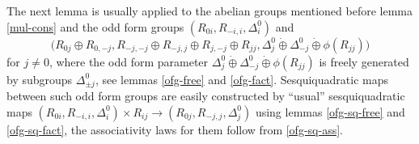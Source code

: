\documentclass{article}
\theoremstyle{definition}
\newcommand{\dotoplus}{\mathbin{\dot{\oplus}}}
\begin{document}
The next lemma is usually applied to the abelian groups mentioned before lemma \ref{mul-cons} and the odd form groups \(
    (R_{0i}, R_{-i, i}, \Delta^0_i)
\) and \[
    \bigl(
        R_{0j} \oplus R_{0, -j},
        R_{-j, -j} \oplus R_{-j, j}
            \oplus R_{j, -j} \oplus R_{jj},
        \Delta^0_j \dotoplus \Delta^0_{-j}
            \dotoplus \phi(R_{jj})
    \bigr)
\] for \(j \neq 0\), where the odd form parameter \(
    \Delta^0_j
    \dotoplus \Delta^0_{-j}
    \dotoplus \phi(R_{jj})
\) is freely generated by subgroups \(\Delta^0_{\pm j}\), see lemmas \ref{ofg-free} and \ref{ofg-fact}. Sesquiquadratic maps between such odd form groups are easily constructed by ``usual'' sesquiquadratic maps \(
    (R_{0i}, R_{-i, i}, \Delta^0_i) \times R_{ij}
    \to (R_{0j}, R_{-j, j}, \Delta^0_j)
\) using lemmas \ref{ofg-sq-free} and \ref{ofg-sq-fact}, the associativity laws for them follow from \ref{ofg-sq-ass}.
\end{document}
